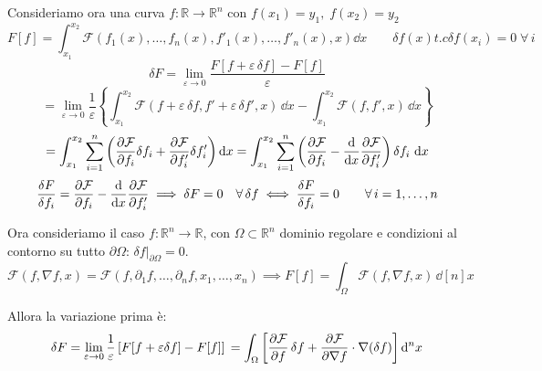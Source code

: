 Consideriamo ora una curva $f: \mathbb{R}\to \mathbb{R}^n $ con $f(x_1)=y_1,\;f(x_2)=y_2 $
\begin{equation}
    F[f] = \int_{x_1}^{x_2}\mathcal{F}(f_1(x),\dots,f_n(x),f'_1(x),\dots,f'_n(x),x)\dd{x}\qquad \delta f(x) t.c \delta f(x_i)=0\;\forall\,i
\end{equation}
\begin{equation*}
    \delta F = \lim_{\varepsilon \to 0} \frac{F[f + \varepsilon \, \delta f] - F[f]}{\varepsilon}
\end{equation*}
\begin{equation*}
    = \lim_{\varepsilon \to 0} \frac{1}{\varepsilon} \left\{
    \int_{x_1}^{x_2} \mathcal{F}(f + \varepsilon \, \delta f, f' + \varepsilon \, \delta f', x) \, \dd{x}
    - \int_{x_1}^{x_2} \mathcal{F}(f, f', x) \, \dd{x}
    \right\}
\end{equation*}
\begin{equation}
    = \int_{x_1}^{x_2} \sum_{i=1}^n \left( \pdv{\mathcal{F}}{f_i} \delta f_i + \pdv{\mathcal{F}}{f_i'} \delta f_i' \right) \dd{x}
    = \int_{x_1}^{x_2} \sum_{i=1}^n \left( \pdv{\mathcal{F}}{f_i} - \dv{x} \pdv{\mathcal{F}}{f_i'} \right) \delta f_i \, \dd{x}
\end{equation}
\begin{equation}
    \frac{\delta F}{\delta f_i}= \pdv{\mathcal{F}}{f_i} - \dv{x} \pdv{\mathcal{F}}{f_i'}
    \implies \delta F = 0 \quad \forall \, \delta f \iff 
    \frac{\delta F}{\delta f_i} = 0 \qquad \forall \, i = 1,\dots,n
\end{equation}

Ora consideriamo il caso \( f : \mathbb{R}^n \to \mathbb{R} \), con \(\Omega \subset \mathbb{R}^n\) dominio regolare e condizioni al contorno su tutto \(\partial \Omega\): \(\delta f|_{\partial \Omega} = 0\).
\begin{equation}
    \mathcal{F}(f, \nabla f, x) = \mathcal{F}\left( f, \partial_1 f, \dots, \partial_n f, x_1, \dots, x_n \right)
    \implies
    F[f] = \int_{\Omega} \mathcal{F}(f, \nabla f, x) \, \dd[n]{x}
\end{equation}

Allora la variazione prima è:
\begin{equation}
    \delta F = \lim_{\varepsilon \to 0} \frac{1}{\varepsilon} \left[ F[f + \varepsilon \delta f] - F[f] \right] \\
    = \int_{\Omega} \left[ \pdv{\mathcal{F}}{f} \, \delta f + \pdv{\mathcal{F}}{\nabla f} \cdot \nabla (\delta f) \right] \dd[n]{x}
\end{equation}

